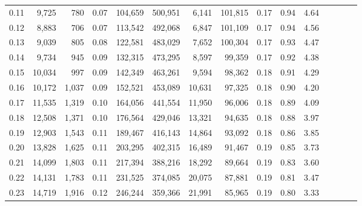 \begin{tabular}{rrrcrrrrrrrrrrr}
0.11 &   9,725 &    780 &                                       0.07 &  104,659 &  500,951 &    6,141 &  101,815 &  0.17 &  0.94 &                         4.64 \\
0.12 &   8,883 &    706 &                                       0.07 &  113,542 &  492,068 &    6,847 &  101,109 &  0.17 &  0.94 &                         4.56 \\
0.13 &   9,039 &    805 &                                       0.08 &  122,581 &  483,029 &    7,652 &  100,304 &  0.17 &  0.93 &                         4.47 \\
0.14 &   9,734 &    945 &                                       0.09 &  132,315 &  473,295 &    8,597 &   99,359 &  0.17 &  0.92 &                         4.38 \\
0.15 &  10,034 &    997 &                                       0.09 &  142,349 &  463,261 &    9,594 &   98,362 &  0.18 &  0.91 &                         4.29 \\
0.16 &  10,172 &  1,037 &                                       0.09 &  152,521 &  453,089 &   10,631 &   97,325 &  0.18 &  0.90 &                         4.20 \\
0.17 &  11,535 &  1,319 &                                       0.10 &  164,056 &  441,554 &   11,950 &   96,006 &  0.18 &  0.89 &                         4.09 \\
0.18 &  12,508 &  1,371 &                                       0.10 &  176,564 &  429,046 &   13,321 &   94,635 &  0.18 &  0.88 &                         3.97 \\
0.19 &  12,903 &  1,543 &                                       0.11 &  189,467 &  416,143 &   14,864 &   93,092 &  0.18 &  0.86 &                         3.85 \\
0.20 &  13,828 &  1,625 &                                       0.11 &  203,295 &  402,315 &   16,489 &   91,467 &  0.19 &  0.85 &                         3.73 \\
0.21 &  14,099 &  1,803 &                                       0.11 &  217,394 &  388,216 &   18,292 &   89,664 &  0.19 &  0.83 &                         3.60 \\
0.22 &  14,131 &  1,783 &                                       0.11 &  231,525 &  374,085 &   20,075 &   87,881 &  0.19 &  0.81 &                         3.47 \\
0.23 &  14,719 &  1,916 &                                       0.12 &  246,244 &  359,366 &   21,991 &   85,965 &  0.19 &  0.80 &                         3.33 \\

\end{tabular}
